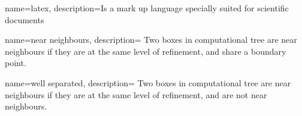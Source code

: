 {
    name=latex,
    description={Is a mark up language specially suited
    for scientific documents}
}

{
    name={near neighbours},
    description={
        Two boxes in computational tree are near neighbours if they are at the
        same level of refinement, and share a boundary point.
    }
}

{
    name={well separated},
    description={
        Two boxes in computational tree are near neighbours if they are at the
        same level of refinement, and are not near neighbours.
    }
}

